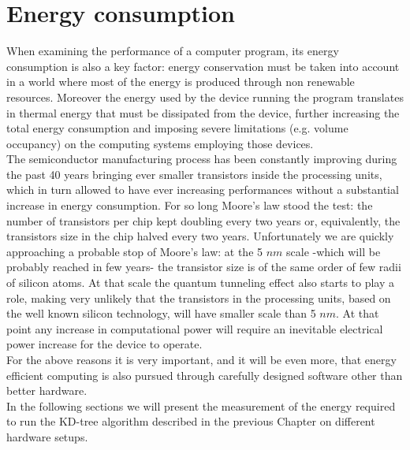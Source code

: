 \chapter{Energy consumption}\label{ch:power}
When examining the performance of a computer program, its energy consumption is also a key factor: energy conservation must be taken into account in a world where most of the energy is produced through non renewable resources. Moreover the energy used by the device running the program translates in thermal energy that must be dissipated from the device, further increasing the total energy consumption and imposing severe limitations (e.g. volume occupancy) on the computing systems employing those devices.\\
The semiconductor manufacturing process has been constantly improving during the past 40 years bringing ever smaller transistors inside the processing units, which in turn allowed to have ever increasing performances without a substantial increase in energy consumption. For so long Moore's law stood the test: the number of transistors per chip kept doubling every two years or, equivalently, the transistors size in the chip halved every two years.
Unfortunately we are quickly approaching a probable stop of Moore's law: at the 5 $\unit{nm}$ scale -which will be probably reached in few years- the transistor size is of the same order of few radii of silicon atoms. At that scale the quantum tunneling effect also starts to play a role, making very unlikely that the transistors in the processing units, based on the well known silicon technology, will have smaller scale than 5 $\unit{nm}$. At that point any increase in computational power will require an inevitable electrical power increase for the device to operate.\\
For the above reasons it is very important, and it will be even more, that energy efficient computing is also pursued through carefully designed software other than better hardware.\\
In the following sections we will present the measurement of the energy required to run the KD-tree algorithm described in the previous Chapter on different hardware setups.

